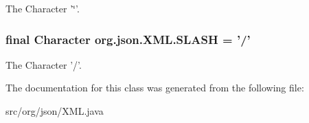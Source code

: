 The Character '\char`\"{}'. \hypertarget{classorg_1_1json_1_1XML_aaa9a255bc94655b02d65b2c8525e5188}{
\subsubsection[{S\-L\-A\-S\-H}]{\setlength{\rightskip}{0pt plus 5cm}final Character org.\-json.\-X\-M\-L.\-S\-L\-A\-S\-H = '/'\hspace{0.3cm}{\ttfamily [static]}}}\label{classorg_1_1json_1_1XML_aaa9a255bc94655b02d65b2c8525e5188}
The Character '/'. 

The documentation for this class was generated from the following file\-:\begin{DoxyCompactItemize}
\item 
src/org/json/X\-M\-L.\-java\end{DoxyCompactItemize}
